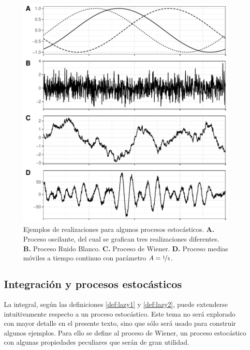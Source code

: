 \documentclass[12pt,letterpaper]{book}
\begin{document}
\begin{figure}
\centering
\includegraphics[width=\linewidth]{./img_mas_ejemplos/ruidos_ejemplos.pdf}
\caption[Ejemplos de procesos estocásticos.]{Ejemplos de realizaciones para algunos procesos estocásticos. \textbf{A.} Proceso oscilante, del cual se grafican tres realizaciones diferentes. \textbf{B.} Proceso Ruido Blanco. \textbf{C.} Proceso de Wiener. \textbf{D.} Proceso medias móviles a tiempo continuo con parámetro $A=\nicefrac{1}{4}$. 
}
\end{figure}

\subsection{Integración y procesos estocásticos}
\label{sec:int_proc_est}

La integral, según las definiciones \ref{def:lazy1} y \ref{def:lazy2}, puede extenderse intuitivamente respecto a un proceso estocástico.
%
Este tema no será explorado con mayor detalle en el presente texto, sino que sólo será usado para construir algunos ejemplos.
%
Para ello se define al proceso de Wiener, un proceso estocástico con algunas propiedades peculiares que serán de gran utilidad.
\end{document}
